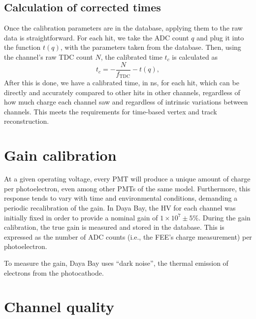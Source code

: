 \documentclass[../thesis.tex]{subfiles}
\begin{document}

\begin{comment}
Show the tof-corrected times; comment on TDC discretization.
\end{comment}

\subsection{Calculation of corrected times}

Once the calibration parameters are in the database, applying them to the raw data is straightforward. For each hit, we take the ADC count $q$ and plug it into the function $t(q)$, with the parameters taken from the database. Then, using the channel's raw TDC count $N$, the calibrated time $t_c$ is calculated as
\[ t_c = -\frac{N}{f_\mathrm{TDC}} - t(q), \]
After this is done, we have a calibrated time, in ns, for each hit, which can be directly and accurately compared to other hits in other channels, regardless of how much charge each channel saw and regardless of intrinsic variations between channels. This meets the requirements for time-based vertex and track reconstruction.

\section{Gain calibration}

At a given operating voltage, every PMT will produce a unique amount of charge per photoelectron, even among other PMTs of the same model. Furthermore, this response tends to vary with time and environmental conditions, demanding a periodic recalibration of the gain. In Daya Bay, the HV for each channel was initially fixed in order to provide a nominal gain of $1 \times 10^7 \pm 5\%$. During the gain calibration, the true gain is measured and stored in the database. This is expressed as the number of ADC counts (i.e., the FEE's charge measurement) per photoelectron.

To measure the gain, Daya Bay uses ``dark noise'', the thermal emission of electrons from the photocathode. 

\section{Channel quality}

\subfilebackmatter
\end{document}
